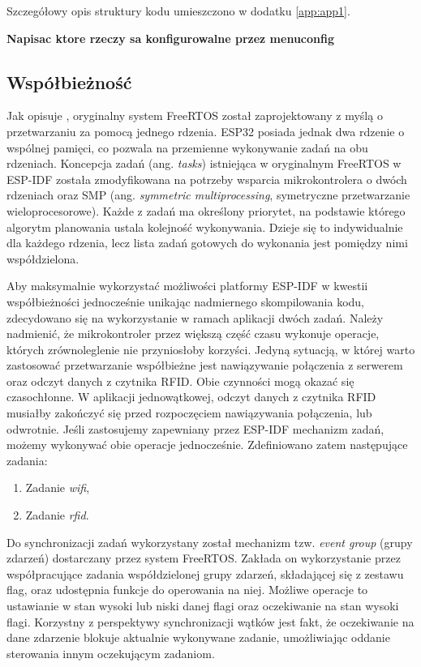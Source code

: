             Szczegółowy opis struktury kodu umieszczono w dodatku \ref{app:app1}.

            \textbf{Napisac ktore rzeczy sa konfigurowalne przez menuconfig}

        \subsection{Współbieżność}
        \label{sub:tasks}

            Jak opisuje \cite{esp-idf-freertos-smp-changes}, oryginalny system FreeRTOS został zaprojektowany z myślą o przetwarzaniu za pomocą jednego rdzenia. ESP32 posiada jednak dwa rdzenie o wspólnej pamięci, co pozwala na przemienne wykonywanie zadań na obu rdzeniach. Koncepcja zadań (ang. \textit{tasks}) istniejąca w oryginalnym FreeRTOS w ESP-IDF została zmodyfikowana na potrzeby wsparcia mikrokontrolera o dwóch rdzeniach oraz SMP (ang. \textit{symmetric multiprocessing}, symetryczne przetwarzanie wieloprocesorowe). Każde z zadań ma określony priorytet, na podstawie którego algorytm planowania ustala kolejność wykonywania. Dzieje się to indywidualnie dla każdego rdzenia, lecz lista zadań gotowych do wykonania jest pomiędzy nimi współdzielona.

            Aby maksymalnie wykorzystać możliwości platformy ESP-IDF w kwestii współbieżności jednocześnie unikając nadmiernego skompilowania kodu, zdecydowano się na wykorzystanie w ramach aplikacji dwóch zadań. Należy nadmienić, że mikrokontroler przez większą część czasu wykonuje operacje, których zrównoleglenie nie przyniosłoby korzyści. Jedyną sytuacją, w której warto zastosować przetwarzanie współbieżne jest nawiązywanie połączenia z serwerem oraz odczyt danych z czytnika RFID. Obie czynności mogą okazać się czasochłonne. W aplikacji jednowątkowej, odczyt danych z czytnika RFID musiałby zakończyć się przed rozpoczęciem nawiązywania połączenia, lub odwrotnie. Jeśli zastosujemy zapewniany przez ESP-IDF mechanizm zadań, możemy wykonywać obie operacje jednocześnie. Zdefiniowano zatem następujące zadania:

            \begin{enumerate}
                \item Zadanie \textit{wifi},
                \item Zadanie \textit{rfid}.
            \end{enumerate}

            Do synchronizacji zadań wykorzystany został mechanizm tzw. \textit{event group} (grupy zdarzeń) dostarczany przez system FreeRTOS. Zakłada on wykorzystanie przez współpracujące zadania współdzielonej grupy zdarzeń, składającej się z zestawu flag, oraz udostępnia funkcje do operowania na niej. Możliwe operacje to ustawianie w stan wysoki lub niski danej flagi oraz oczekiwanie na stan wysoki flagi. Korzystny z perspektywy synchronizacji wątków jest fakt, że oczekiwanie na dane zdarzenie blokuje aktualnie wykonywane zadanie, umożliwiając oddanie sterowania innym oczekującym zadaniom.

